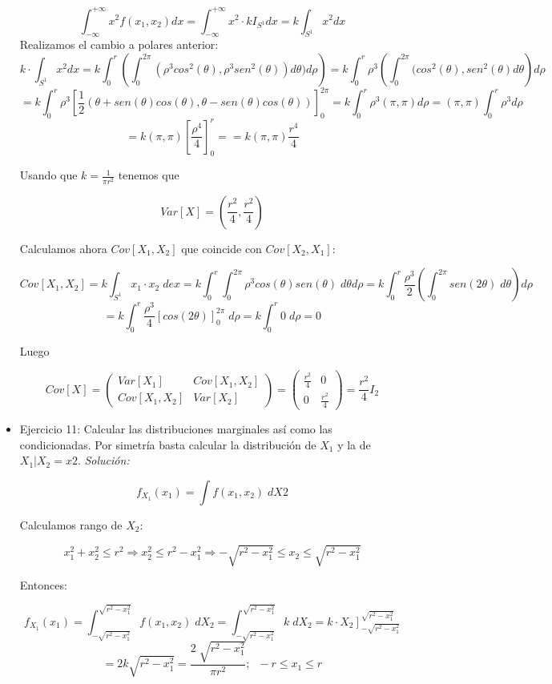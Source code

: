 \documentclass{article}
\theoremstyle{theorem-style}  %
\theoremstyle{definition}
\theoremstyle{example-style}
\begin{document}
\begin{itemize}
		$$\int_{-\infty}^{+\infty}x^2f(x_1,x_2)dx = \int_{-\infty}^{+\infty}x^2\cdot kI_{S^1}dx = k\int_{S^1}x^2dx$$
		Realizamos el cambio a polares anterior:
		$$k\cdot \int_{S^1}x^2dx = k \int_{0}^{r}\left(\int_{0}^{2\pi}(\rho^3cos^2(\theta),\rho^3sen^2(\theta))d\theta)d\rho\right) = k \int_{0}^{r}\rho^3\left(\int_0^{2\pi}(cos^2(\theta),sen^2(\theta)d\theta\right)d\rho$$
		$$=k \int_{0}^{r}\rho^3\left[\frac{1}{2}\left(\theta+sen(\theta)cos(\theta),\theta-sen(\theta)cos(\theta)\right)\right]^{2\pi}_{0} =k\int_{0}^{r}\rho^3(\pi,\pi)d\rho = (\pi,\pi)\int_{0}^{r}\rho^3 d\rho$$
		$$=k(\pi,\pi)\left[\frac{\rho^4}{4}\right]^r_0 = =k(\pi,\pi)\frac{r^4}{4}$$
		
		Usando que $k=\displaystyle\frac{1}{\pi r^2}$ tenemos que 
		
		$$Var[X]=\left(\frac{r^2}{4},\frac{r^2}{4}\right)$$
		
		Calculamos ahora $Cov[X_1,X_2]$ que coincide con $Cov[X_2,X_1]$:
		
		$$Cov[X_1,X_2] = k \int_{S^1}x_1\cdot x_2\; dex = k \int_{0}^{r}\int_{0}^{2\pi}\rho^3cos(\theta)sen(\theta)\;d\theta d\rho = k \int_{0}^{r}\frac{\rho^3}{2}\left(\int_{0}^{2\pi}sen(2\theta)\;d\theta\right)d\rho$$
		$$=k\int_{0}^{r}\frac{\rho^3}{4}\left[cos(2\theta)\right]_0^{2\pi}\;d\rho=k\int_{0}^{r}0\;d\rho = 0$$
		
		Luego
		
		$$Cov[X] = \left( \begin{array}{cc}
		Var[X_1] & Cov[X_1,X_2]\\
		Cov[X_1,X_2] & Var[X_2]
		\end{array}\right) =
		\left( \begin{array}{cc}
		\frac{r^2}{4} & 0\\
		0 & \frac{r^2}{4}
		\end{array}\right) = \frac{r^2}{4}I_2$$
		
		
		\item Ejercicio 11: Calcular las distribuciones marginales así como las condicionadas. Por simetría basta calcular la distribución de $X_1$  y la de $X_1|X_2=x2$. 
		\textit{Solución:}
		
		$$f_{X_1}(x_1)=\int f(x_1,x_2)\; dX2$$
		
		Calculamos rango de $X_2$:
		
		$$x_1^2+x_2^2 \leq r^2 \Rightarrow x_2^2 \leq r^2 - x_1^2 \Rightarrow -\sqrt{r^2-x_1^2}\leq x_2 \leq\sqrt{r^2-x_1^2}$$
		
		Entonces:
		
		$$f_{X_1}(x_1) = \int_{-\sqrt{r^2-x_1^2}}^{\sqrt{r^2-x_1^2}}f(x_1,x_2) \; dX_2 = \int_{-\sqrt{r^2-x_1^2}}^{\sqrt{r^2-x_1^2}}k \; dX_2 = k\cdot \displaystyle\left.X_2\right]_{-\sqrt{r^2-x_1^2}}^{\sqrt{r^2-x_1^2}}$$
		$$=2k\sqrt{r^2-x_1^2} = \frac{2\;\sqrt{r^2-x_1^2}}{\pi r^2};\;\;-r\leq x_1\leq r$$
		

\end{itemize}
\end{document}
